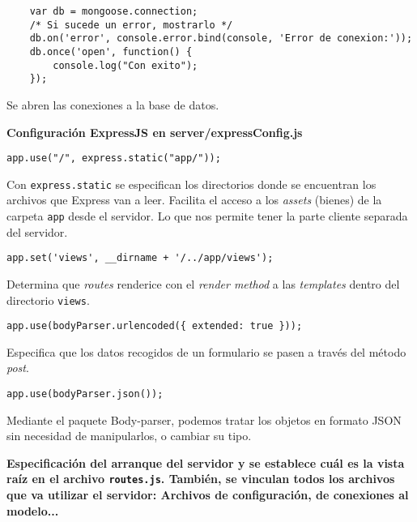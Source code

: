 \medskip
\begin{lstlisting}
	var db = mongoose.connection;
	/* Si sucede un error, mostrarlo */
	db.on('error', console.error.bind(console, 'Error de conexion:'));
	db.once('open', function() {
		console.log("Con exito");
	});
\end{lstlisting}



Se abren las conexiones a la base de datos.\newline


 
\textbf{Configuración ExpressJS en server/expressConfig.js}


\medskip
\begin{lstlisting}
app.use("/", express.static("app/"));
\end{lstlisting}


Con \texttt{express.static} se especifican los directorios donde se encuentran los archivos que Express van a leer. Facilita el acceso a los \textit{assets} (bienes) de la carpeta \texttt{app} desde el servidor. Lo que nos permite tener la parte cliente separada del servidor. 


\medskip
\begin{lstlisting}
app.set('views', __dirname + '/../app/views');
\end{lstlisting}


Determina que \textit{routes} renderice con el \textit{render method} a las \textit{templates} dentro del directorio \texttt{views}.


\medskip
\begin{lstlisting}
app.use(bodyParser.urlencoded({ extended: true }));
\end{lstlisting}


Especifica que los datos recogidos de un formulario se pasen a través del método \textit{post}.


\medskip
\begin{lstlisting}
app.use(bodyParser.json());
\end{lstlisting}


Mediante el paquete Body-parser, podemos tratar los objetos en formato JSON sin necesidad de manipularlos, o cambiar su tipo.\newline

 
\textbf{Especificación del arranque del servidor y se establece cuál es la vista raíz en el archivo \texttt{routes.js}. También, se vinculan todos los archivos que va utilizar el servidor: Archivos de configuración, de conexiones al modelo...}


